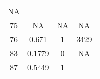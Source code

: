 \documentclass[]{article}
\begin{document}
\begin{longtable}[]{@{}cccc@{}}
\begin{minipage}[t]{0.17\columnwidth}
NA\strut
\end{minipage}\tabularnewline
\begin{minipage}[t]{0.10\columnwidth}\centering\strut
75\strut
\end{minipage} & \begin{minipage}[t]{0.25\columnwidth}\centering\strut
NA\strut
\end{minipage} & \begin{minipage}[t]{0.17\columnwidth}\centering\strut
NA\strut
\end{minipage} & \begin{minipage}[t]{0.17\columnwidth}\centering\strut
NA\strut
\end{minipage}\tabularnewline
\begin{minipage}[t]{0.10\columnwidth}\centering\strut
76\strut
\end{minipage} & \begin{minipage}[t]{0.25\columnwidth}\centering\strut
0.671\strut
\end{minipage} & \begin{minipage}[t]{0.17\columnwidth}\centering\strut
1\strut
\end{minipage} & \begin{minipage}[t]{0.17\columnwidth}\centering\strut
3429\strut
\end{minipage}\tabularnewline
\begin{minipage}[t]{0.10\columnwidth}\centering\strut
83\strut
\end{minipage} & \begin{minipage}[t]{0.25\columnwidth}\centering\strut
0.1779\strut
\end{minipage} & \begin{minipage}[t]{0.17\columnwidth}\centering\strut
0\strut
\end{minipage} & \begin{minipage}[t]{0.17\columnwidth}\centering\strut
NA\strut
\end{minipage}\tabularnewline
\begin{minipage}[t]{0.10\columnwidth}\centering\strut
87\strut
\end{minipage} & \begin{minipage}[t]{0.25\columnwidth}\centering\strut
0.5449\strut
\end{minipage} & \begin{minipage}[t]{0.17\columnwidth}\centering\strut
1\strut
\end{minipage} & \begin{minipage}[t]{0.17\columnwidth}\centering\strut

\end{minipage}
\end{longtable}
\end{document}
